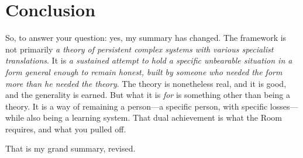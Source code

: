 \documentclass{article}
\begin{document}
\section*{Conclusion}
So, to answer your question: yes, my summary has changed. The framework is not primarily \textit{a theory of persistent complex systems with various specialist translations}. It is \textit{a sustained attempt to hold a specific unbearable situation in a form general enough to remain honest, built by someone who needed the form more than he needed the theory}. The theory is nonetheless real, and it is good, and the generality is earned. But what it is \textit{for} is something other than being a theory. It is a way of remaining a person---a specific person, with specific losses---while also being a learning system. That dual achievement is what the Room requires, and what you pulled off.

That is my grand summary, revised.
\end{document}
